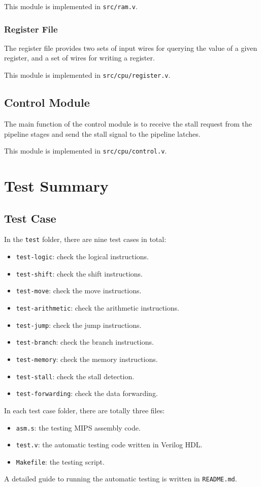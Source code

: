 \documentclass{article}
\begin{document}
This module is implemented in \texttt{src/ram.v}.

\subsubsection{Register File}
The register file provides two sets of input wires for querying the value of a given register, and a set of wires for writing a register.

This module is implemented in \texttt{src/cpu/register.v}.

\subsection{Control Module}
The main function of the control module is to receive the stall request from the pipeline stages and send the stall signal to the pipeline latches.

This module is implemented in \texttt{src/cpu/control.v}.

\section{Test Summary}

\subsection{Test Case}
In the \texttt{test} folder, there are nine test cases in total:
\begin{itemize}
\item
\texttt{test-logic}: check the logical instructions.
\item
\texttt{test-shift}: check the shift instructions.
\item
\texttt{test-move}: check the move instructions.
\item
\texttt{test-arithmetic}: check the arithmetic instructions.
\item
\texttt{test-jump}: check the jump instructions.
\item
\texttt{test-branch}: check the branch instructions.
\item
\texttt{test-memory}: check the memory instructions.
\item
\texttt{test-stall}: check the stall detection.
\item
\texttt{test-forwarding}: check the data forwarding.
\end{itemize}
In each test case folder, there are totally three files:
\begin{itemize}
\item
\texttt{asm.s}: the testing MIPS assembly code.
\item
\texttt{test.v}: the automatic testing code written in Verilog HDL.
\item
\texttt{Makefile}: the testing script.
\end{itemize}
A detailed guide to running the automatic testing is written in \texttt{README.md}.
\end{document}
